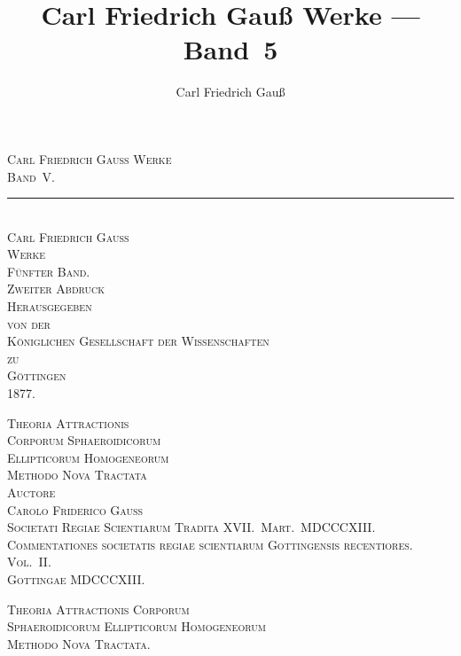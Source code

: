 \documentclass[12pt,a4paper]{article}
\title{Carl Friedrich Gau\ss{} Werke --- Band~5}
\author{Carl Friedrich Gau\ss{}}
\date{}
\theoremstyle{gauss}
\begin{document}
\maketitle
\thispagestyle{empty}

\begin{center}
\Large\textsc{Carl Friedrich Gau\ss{} Werke}\\[6pt]
\large\textsc{Band~V.}\\[24pt]
\rule{0.5\textwidth}{0.4pt}\\[24pt]
\Large\textsc{Carl Friedrich Gau\ss}\\[6pt]
\large\textsc{Werke}\\[12pt]
\Large\textsc{F\"unfter Band.}\\[12pt]
\normalsize\textsc{Zweiter Abdruck}\\[6pt]
\textsc{Herausgegeben}\\[3pt]
\textsc{von der}\\[3pt]
\textsc{K\"oniglichen Gesellschaft der Wissenschaften}\\[3pt]
\textsc{zu}\\[3pt]
\textsc{G\"ottingen}\\[12pt]
\textsc{1877.}
\end{center}

\newpage
\setcounter{page}{11}

\begin{center}
\Large\textsc{Theoria Attractionis}\\[4pt]
\Large\textsc{Corporum Sphaeroidicorum}\\[4pt]
\Large\textsc{Ellipticorum Homogeneorum}\\[4pt]
\Large\textsc{Methodo Nova Tractata}\\[12pt]
\normalsize\textsc{Auctore}\\[4pt]
\textsc{Carolo Friderico Gauss}\\[6pt]
\small\textsc{Societati Regiae Scientiarum Tradita XVII.~Mart.~MDCCCXIII.}\\[3pt]
\textsc{Commentationes societatis regiae scientiarum Gottingensis recentiores. Vol.~II.}\\[3pt]
\textsc{Gottingae MDCCCXIII.}
\end{center}

\vspace{12pt}

\begin{center}
\Large\textsc{Theoria Attractionis Corporum}\\[4pt]
\Large\textsc{Sphaeroidicorum Ellipticorum Homogeneorum}\\[4pt]
\Large\textsc{Methodo Nova Tractata.}
\end{center}
\end{document}
